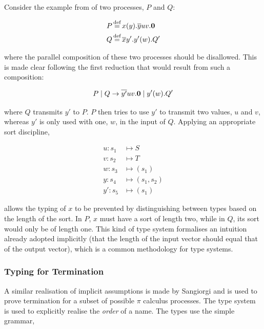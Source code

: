 Consider the example from \cite{milner:pi} of two processes, $P$ and
$Q$:

\begin{align}
P & \operatorname{\stackrel{\textrm{def}}{=}} x(y).\overline{y}uv.\textbf{0} \\
Q & \operatorname{\stackrel{\textrm{def}}{=}} \overline{x}y'.y'(w).Q' 
\end{align}

\noindent where the parallel composition of these two processes should
be disallowed.  This is made clear following the first reduction that
would result from such a composition:

\begin{equation}
P \;|\; Q \rightarrow \overline{y'}uv.\textbf{0} \;|\; y'(w).Q'
\end{equation}

\noindent where $Q$ transmits $y'$ to $P$.  $P$ then tries to use $y'$
to transmit two values, $u$ and $v$, whereas $y'$ is only used with
one, $w$, in the input of $Q$.  Applying an appropriate sort discipline,

\begin{equation}
\begin{aligned}
u: s_1 & \mapsto S \\
v: s_2 & \mapsto T \\
w: s_3 & \mapsto (s_1) \\
y: s_4 & \mapsto (s_1, s_2) \\
y': s_5 & \mapsto (s_1)
\end{aligned}
\end{equation}

\noindent allows the typing of $x$ to be prevented by distinguishing
between types based on the length of the sort.  In $P$, $x$ must have
a sort of length two, while in $Q$, its sort would only be of length
one.  This kind of type system formalises an intuition already adopted
implicitly (that the length of the input vector should equal that of
the output vector), which is a common methodology for type systems.

\subsubsection{Typing for Termination}

A similar realisation of implicit assumptions is made by Sangiorgi
\cite{sangiorgi:types-or} and is used to prove termination for a
subset of possible $\pi$ calculus processes.  The type system is used
to explicitly realise the \emph{order} of a name.  The types use the
simple grammar,

